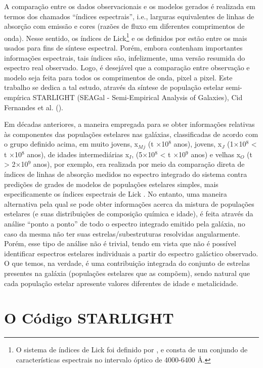 A comparação entre os dados observacionais e os modelos gerados é realizada em termos dos chamados “índices espectrais”, i.e., larguras equivalentes de linhas de absorção com emissão e cores (razões de fluxo em diferentes comprimentos de onda). Nesse sentido, os índices de Lick\footnote{O sistema de índices de Lick foi definido por \cite{faber}, e consta de um conjundo de características espectrais no intervalo óptico de 4000-6400 \AA.} \cite{trager1998old} e os definidos por \cite{bica1988A} estão entre os mais usados para fins de síntese espectral. Porém, embora contenham importantes informações espectrais, tais índices são, infelizmente, uma versão resumida do espectro real observado. Logo, é desejável que a comparação entre observação e modelo seja feita para todos os comprimentos de onda, pixel a pixel. Este trabalho se dedica a tal estudo, através da síntese de população estelar semi-empírica STARLIGHT (SEAGal - Semi-Empirical Analysis of Galaxies), Cid Fernandes et al. (\cite{cid2004star,fernandes2005semi,fernandes2007uncovering}).

Em décadas anteriores, a maneira empregada para se obter informações relativas às componentes das populações estelares nas galáxias, classificadas de acordo com o grupo definido acima, em muito jovens, x$_M${$_j$} 
(t  $\times$10$^8$ anos), jovens, x{$_J$} (1$\times$10{$^8$} < t $\times$10{$^8$} anos), de idades intermediárias x{$_I$}, (5$\times$10$^8$ < t $\times$10{$^9$} anos) e velhas x{$_O$} (t > 2$\times$10$^9$ anos), por exemplo, era realizada por meio da comparação direta de índices de linhas de absorção medidos no espectro integrado do sistema contra predições de grades de modelos de populações estelares simples, mais especificamente os índices espectrais de Lick \cite{trager1998old}. No entanto, uma maneira alternativa pela qual se pode obter informações acerca da mistura de populações estelares (e suas distribuições de composição química e idade), é feita através da análise “ponto a ponto” de todo o espectro integrado emitido pela galáxia, no caso da mesma não ter suas estrelas/subestruturas resolvidas angularmente. Porém, esse tipo de análise não é trivial, tendo em vista que não é possível identificar espectros estelares individuais a partir do espectro galáctico observado. O que temos, na verdade, é uma contribuição integrada do conjunto de estrelas presentes na galáxia (populações estelares que as compõem), sendo natural que cada população estelar apresente valores diferentes de idade e metalicidade.

\section{O Código STARLIGHT}

